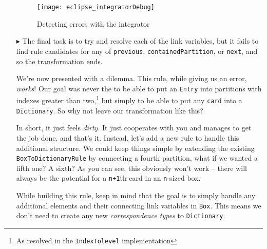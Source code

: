 \begin{itemize}
\begin{figure}[htb]
\begin{center}
  \texttt{[image: eclipse\_integratorDebug]}
  \caption{Detecting errors with the integrator}
  \label{eclipse:integrator_debugSuccess}
\end{center}
\end{figure}

\item[$\blacktriangleright$] The final task is to try and resolve each of the link variables, but it fails to find rule candidates for any of \texttt{previous},
\texttt{containedPartition}, or \texttt{next}, and so the transformation ends.

\clearpage

We're now presented with a dilemma. This rule, while giving us an error, \emph{works}! Our goal was never the to be able to put an \texttt{Entry} into
partitions with indexes greater than two,\footnote{As resolved in the \texttt{IndexTolevel} implementation} but simply to be able to put any \texttt{card} into
a \texttt{Dictionary}. So why not leave our transformation like this?

\vspace{0.5cm}

In short, it just feels \emph{dirty}. It just cooperates with you and manages to get the job done, and that's it. Instead, let's add a new rule to handle this
additional structure. We could keep things simple by extending the existing \texttt{BoxToDictionaryRule} by connecting a fourth partition, what if we wanted a
fifth one? A sixth? As you can see, this obviously won't work -- there will always be the potential for a \texttt{n+1}th card in an \texttt{n}-sized
box. 

\vspace{0.5cm}

While building this rule, keep in mind that the goal is to simply handle any additional elements and their connecting link variables in \texttt{Box}. This means
we don't need to create any new \emph{correspondence types} to \texttt{Dictionary}.

\end{itemize}







% 
